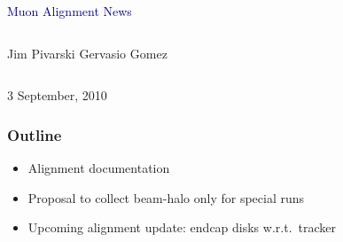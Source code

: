 \documentclass[compress]{beamer}
\begin{document}
\begin{frame}
\vfill
\begin{center}
\textcolor{darkblue}{\Large Muon Alignment News}

\vfill
\begin{columns}
\begin{center}
\large
Jim Pivarski \hspace{0.5 cm} Gervasio Gomez
\end{center}
\end{columns}

\vfill
 3 September, 2010

\end{center}
\end{frame}


\small

\begin{frame}
\frametitle{Outline}
\begin{itemize}\setlength{\itemsep}{0.75 cm}
\item Alignment documentation
\item Proposal to collect beam-halo only for special runs
\item Upcoming alignment update: endcap disks w.r.t.\ tracker
\end{itemize}
\end{frame}
\end{document}
